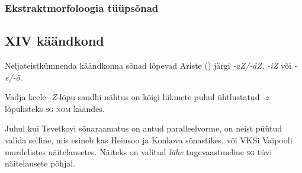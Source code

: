 \documentclass[12pt,a4paper]{article}
\newcommand{\vadja}[1]{\textit{#1}}
\newcommand{\msd}[1]{\textsc{#1}}
\begin{document}


\subsubsection*{Ekstraktmorfoloogia tüüpsõnad}
\vspace{-3.5em}












\subsection{\RN{14} käändkond}

Neljateistkümnenda käändkonna sõnad lõpevad Ariste (\citeyear[50]{ariste_grammar_1968}) järgi \vadja{-aZ/-äZ, -iZ} või \vadja{-e/-õ}. %

Vadja keele \vadja{-Z}-lõpu sandhi nähtus on kõigi liikmete puhul ühtlustatud \vadja{-z}-lõpulisteks \msd{sg nom} käändes.

Juhul kui Tsvetkovi sõnaraamatus on antud paralleelvorme, on neist püütud valida selline, mis esineb kas Heinsoo ja Konkova sõnastikes, või VKSi Vaipooli murdelistes näite\-lausetes. Näiteks on valitud \vadja{lähe} tugeva\-astmeline \msd{sg} tüvi näite\-lausete põhjal.

\end{document}
